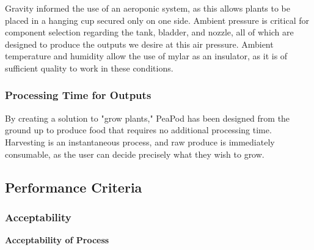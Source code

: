 \documentclass{report}
\begin{document}

Gravity informed the use of an aeroponic system, as this allows plants to be placed in a hanging cup secured only on one side. Ambient pressure is critical for component selection regarding the tank, bladder, and nozzle, all of which are designed to produce the outputs we desire at this air pressure. Ambient temperature and humidity allow the use of mylar as an insulator, as it is of sufficient quality to work in these conditions.

\subsubsection{Processing Time for Outputs} 
\label{sec:constraints-processing}


By creating a solution to "grow plants," PeaPod has been designed from the ground up to produce food that requires no additional processing time. Harvesting is an instantaneous process, and raw produce is immediately consumable, as the user can decide precisely what they wish to grow.

\subsection{Performance Criteria}


\subsubsection{Acceptability}
\label{sec:acceptability}

\textbf{Acceptability of Process}
\label{sec:acceptability-process}
\end{document}
